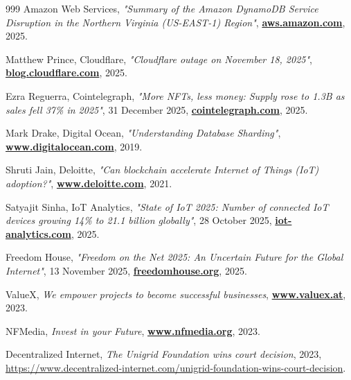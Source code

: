 \documentclass[a4paper,oneside]{article}
\let\oldhref\href
\renewcommand{\href}[2]{\oldhref{#1}{\bfseries#2}}
\begin{document}
\begin{thebibliography}{999}
    Amazon Web Services,
    \emph{"Summary of the Amazon DynamoDB Service Disruption in the Northern Virginia (US-EAST-1) Region"},
    \href{https://aws.amazon.com/message/101925/}{aws.amazon.com},
    2025.

    Matthew Prince, Cloudflare,
    \emph{"Cloudflare outage on November 18, 2025"},
    \href{https://blog.cloudflare.com/18-november-2025-outage/}{blog.cloudflare.com},
    2025.

    Ezra Reguerra, Cointelegraph,
    \emph{"More NFTs, less money: Supply rose to 1.3B as sales fell 37\% in 2025"},
    31 December 2025,
    \href{https://cointelegraph.com/news/nft-supply-growth-sales-decline-2025}{cointelegraph.com},
    2025.

    Mark Drake, Digital Ocean,
    \emph{"Understanding Database Sharding"},
    \href{https://www.digitalocean.com/community/tutorials/understanding-database-sharding}{www.digitalocean.com},
    2019.

    Shruti Jain, Deloitte,
    \emph{"Can blockchain accelerate Internet of Things (IoT) adoption?"},
    \href{https://www2.deloitte.com/ch/en/pages/innovation/articles/blockchain-accelerate-iot-adoption.html}{www.deloitte.com},
    2021.

    Satyajit Sinha, IoT Analytics,
    \emph{"State of IoT 2025: Number of connected IoT devices growing 14\% to 21.1 billion globally"},
    28 October 2025,
    \href{https://iot-analytics.com/number-connected-iot-devices/}{iot-analytics.com},
    2025.

    Freedom House,
    \emph{"Freedom on the Net 2025: An Uncertain Future for the Global Internet"},
    13 November 2025,
    \href{https://freedomhouse.org/article/new-report-persistent-authoritarian-repression-and-backsliding-democracies-drive-15th}{freedomhouse.org},
    2025.

	ValueX,
	\emph{We empower projects to become successful businesses},
	\href{https://www.valuex.at}{www.valuex.at},
	2023.

	NFMedia,
	\emph{Invest in your Future},
	\href{https://www.nfmedia.org}{www.nfmedia.org},
	2023.

	Decentralized Internet,
	\emph{The Unigrid Foundation wins court decision},
	2023,
	\url{https://www.decentralized-internet.com/unigrid-foundation-wins-court-decision}.


\end{thebibliography}
\end{document}
